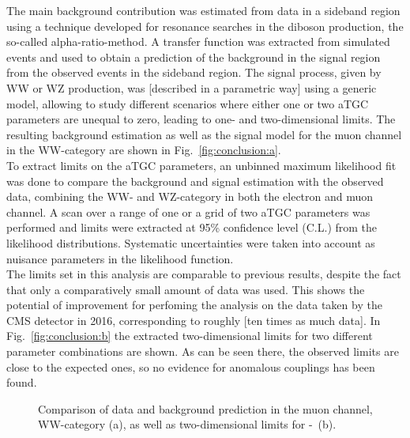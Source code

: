 The main background contribution was estimated from data in a sideband region using a technique developed for resonance searches in the diboson production, the so-called alpha-ratio-method. A transfer function was extracted from simulated events and used to obtain a prediction of the background in the signal region from the observed events in the sideband region. The signal process, given by WW or WZ production, was [described in a parametric way] using a generic model, allowing to study different scenarios where either one or two aTGC parameters are unequal to zero, leading to one- and two-dimensional limits. The resulting background estimation as well as the signal model for the muon channel in the WW-category are shown in Fig.~\ref{fig:conclusion:a}.\\

To extract limits on the aTGC parameters, an unbinned maximum likelihood fit was done to compare the background and signal estimation with the observed data, combining the WW- and WZ-category in both the electron and muon channel. A scan over a range of one or a grid of two aTGC parameters was performed and limits were extracted at 95\% confidence level (C.L.) from the likelihood distributions. Systematic uncertainties were taken into account as nuisance parameters in the likelihood function.\\

The limits set in this analysis are comparable to previous results, despite the fact that only a comparatively small amount of data was used. This shows the potential of improvement for perfoming the analysis on the data taken by the CMS detector in 2016, corresponding to roughly [ten times as much data]. In Fig.~\ref{fig:conclusion:b} the extracted two-dimensional limits for two different parameter combinations are shown. As can be seen there, the observed limits are close to the expected ones, so no evidence for anomalous couplings has been found.

\begin{figure}
    \centering
    \resizebox{\columnwidth}{!}
    {%
    \caption[Comparison of data and background prediction as well as two-dimensional limits for \Tccw -\Tcb]{Comparison of data and background prediction in the muon channel, WW-category (a), as well as two-dimensional limits for \Tccw -\Tcb \ (b).}
    \label{fig:conclusion}
    }
\end{figure}